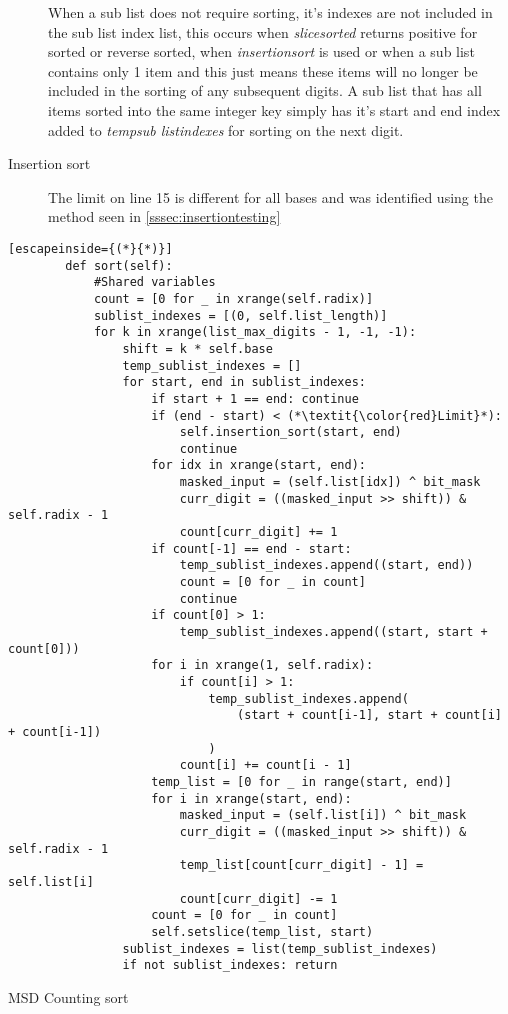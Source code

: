 \documentclass[12pt]{article}
\begin{document}
\begin{description}
	\par When a sub list does not require sorting, it's indexes are not included in the sub list index list, this occurs when \textit{slice\textunderscore sorted} returns positive for sorted or reverse sorted, when \textit{insertion\textunderscore sort} is used or when a sub list contains only 1 item and this just means these items will no longer be included in the sorting of any subsequent digits. A sub list that has all items sorted into the same integer key simply has it's start and end index added to \textit{temp\textunderscore sub list\textunderscore indexes} for sorting on the next digit.
	\item[Insertion sort] The limit on line 15 is different for all bases and was identified using the method seen in \ref{sssec:insertiontesting}
\end{description}
\begin{table}[H]
	\lstset{
		language=python,
    numbers=left,
    stepnumber=1,
    showstringspaces=false,
    tabsize=3,
    breaklines=true,
    breakatwhitespace=false,}
	\centering
	\begin{lstlisting}[escapeinside={(*}{*)}]
        def sort(self):
			#Shared variables
			count = [0 for _ in xrange(self.radix)]
			sublist_indexes = [(0, self.list_length)]
			for k in xrange(list_max_digits - 1, -1, -1):
				shift = k * self.base
				temp_sublist_indexes = []
				for start, end in sublist_indexes:
					if start + 1 == end: continue
					if (end - start) < (*\textit{\color{red}Limit}*):
						self.insertion_sort(start, end)
						continue
					for idx in xrange(start, end):
						masked_input = (self.list[idx]) ^ bit_mask
						curr_digit = ((masked_input >> shift)) & self.radix - 1
						count[curr_digit] += 1
					if count[-1] == end - start:
						temp_sublist_indexes.append((start, end))
						count = [0 for _ in count]
						continue
					if count[0] > 1:
						temp_sublist_indexes.append((start, start + count[0]))
					for i in xrange(1, self.radix):
						if count[i] > 1:
							temp_sublist_indexes.append(
								(start + count[i-1], start + count[i] + count[i-1])
							)
						count[i] += count[i - 1]
					temp_list = [0 for _ in range(start, end)]
					for i in xrange(start, end):
						masked_input = (self.list[i]) ^ bit_mask
						curr_digit = ((masked_input >> shift)) & self.radix - 1
						temp_list[count[curr_digit] - 1] = self.list[i]
						count[curr_digit] -= 1
					count = [0 for _ in count]
					self.setslice(temp_list, start)
				sublist_indexes = list(temp_sublist_indexes)
				if not sublist_indexes: return
\end{lstlisting}
\caption*{MSD Counting sort}
\end{table}
\end{document}
